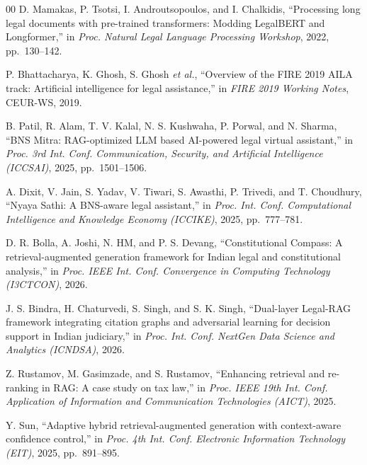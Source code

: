 \documentclass[conference]{IEEEtran}
\begin{document}
\begin{thebibliography}{00}
 D. Mamakas, P. Tsotsi, I. Androutsopoulos, and I. Chalkidis, ``Processing long legal documents with pre-trained transformers: Modding LegalBERT and Longformer,'' in \textit{Proc. Natural Legal Language Processing Workshop}, 2022, pp.~130--142.

 P. Bhattacharya, K. Ghosh, S. Ghosh \textit{et al.}, ``Overview of the FIRE 2019 AILA track: Artificial intelligence for legal assistance,'' in \textit{FIRE 2019 Working Notes}, CEUR-WS, 2019.

 B. Patil, R. Alam, T. V. Kalal, N. S. Kushwaha, P. Porwal, and N. Sharma, ``BNS Mitra: RAG-optimized LLM based AI-powered legal virtual assistant,'' in \textit{Proc. 3rd Int. Conf. Communication, Security, and Artificial Intelligence (ICCSAI)}, 2025, pp.~1501--1506.

 A. Dixit, V. Jain, S. Yadav, V. Tiwari, S. Awasthi, P. Trivedi, and T. Choudhury, ``Nyaya Sathi: A BNS-aware legal assistant,'' in \textit{Proc. Int. Conf. Computational Intelligence and Knowledge Economy (ICCIKE)}, 2025, pp.~777--781.

 D. R. Bolla, A. Joshi, N. HM, and P. S. Devang, ``Constitutional Compass: A retrieval-augmented generation framework for Indian legal and constitutional analysis,'' in \textit{Proc. IEEE Int. Conf. Convergence in Computing Technology (I3CTCON)}, 2026.

 J. S. Bindra, H. Chaturvedi, S. Singh, and S. K. Singh, ``Dual-layer Legal-RAG framework integrating citation graphs and adversarial learning for decision support in Indian judiciary,'' in \textit{Proc. Int. Conf. NextGen Data Science and Analytics (ICNDSA)}, 2026.

 Z. Rustamov, M. Gasimzade, and S. Rustamov, ``Enhancing retrieval and re-ranking in RAG: A case study on tax law,'' in \textit{Proc. IEEE 19th Int. Conf. Application of Information and Communication Technologies (AICT)}, 2025.

 Y. Sun, ``Adaptive hybrid retrieval-augmented generation with context-aware confidence control,'' in \textit{Proc. 4th Int. Conf. Electronic Information Technology (EIT)}, 2025, pp.~891--895.

\end{thebibliography}
\end{document}
